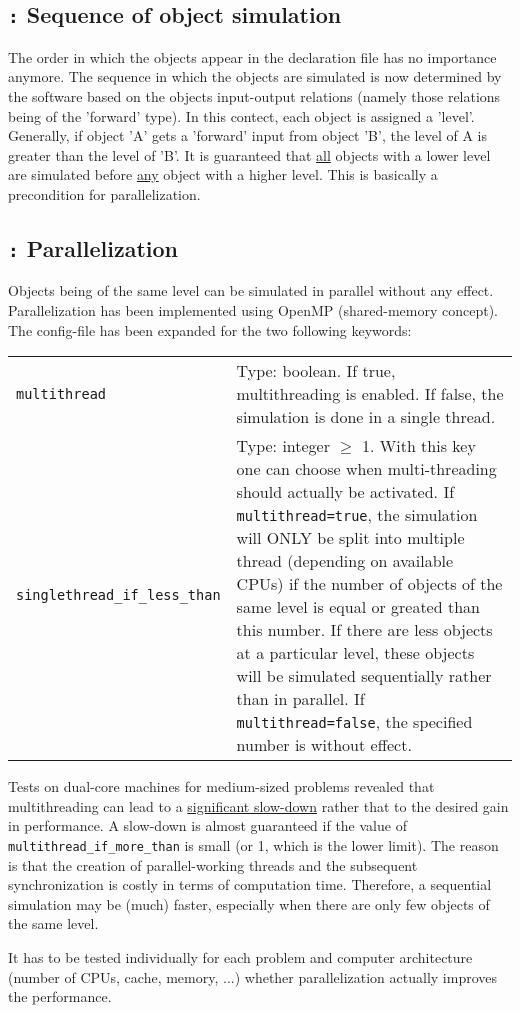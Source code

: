 \documentclass[a4paper,10pt]{article}
\newcommand{\logentry}[2]{\subsection*{\texttt{\color{red}{#1}:} \large{\textbf{#2}}}}
\begin{document}
\logentry{2011-10-24}{Sequence of object simulation}
The order in which the objects appear in the declaration file has no importance anymore. The sequence in which the objects are simulated is now determined by the software based on the objects input-output relations (namely those relations being of the 'forward' type). In this contect, each object is assigned a 'level'. Generally, if object 'A' gets a 'forward' input from object 'B', the level of A is greater than the level of 'B'. It is guaranteed that \underline{all} objects with a lower level are simulated before \underline{any} object with a higher level. This is basically a precondition for parallelization.

\logentry{2011-10-24}{Parallelization}
Objects being of the same level can be simulated in parallel without any effect. Parallelization has been implemented using OpenMP (shared-memory concept). The config-file has been expanded for the two following keywords:
\begin{tabular}{p{}p{}}
  \verb!multithread! & Type: boolean. If true, multithreading is enabled. If false, the simulation is done in a single thread. \\
  \verb!singlethread_if_less_than! & Type: integer $\geq$ 1. With this key one can choose when multi-threading should actually be activated. If \verb!multithread=true!, the simulation will ONLY be split into multiple thread (depending on available CPUs) if the number of objects of the same level is equal or greated than this number. If there are less objects at a particular level, these objects will be simulated sequentially rather than in parallel. If \verb!multithread=false!, the specified number is without effect. \\
\end{tabular}

Tests on dual-core machines for medium-sized problems revealed that multithreading can lead to a \underline{significant slow-down} rather that to the desired gain in performance. A slow-down is almost guaranteed if the value of \verb!multithread_if_more_than! is small (or 1, which is the lower limit). The reason is that the creation of parallel-working threads and the subsequent synchronization is costly in terms of computation time. Therefore, a sequential simulation may be (much) faster, especially when there are only few objects of the same level.

It has to be tested individually for each problem and computer architecture (number of CPUs, cache, memory, ...) whether parallelization actually improves the performance.
\end{document}
